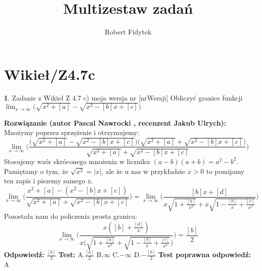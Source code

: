 \documentclass[12pt, a4paper]{article}
\title{Multizestaw zadań}
\author{Robert Fidytek}
\date{}
\theoremstyle{definition} %
\newtheorem{zad}{}
\newcommand{\kategoria}[1]{\section{#1}} %
\newcommand{\zadStart}[1]{\begin{zad}#1\newline} %
\newcommand{\zadStop}{\end{zad}}   %
\newcommand{\rozwStart}[2]{\noindent \textbf{Rozwiązanie (autor #1 , recenzent #2): }\newline} %
\newcommand{\rozwStop}{\newline}                                            %
\newcommand{\odpStart}{\noindent \textbf{Odpowiedź:}\newline}    %
\newcommand{\odpStop}{\newline}                                             %
\newcommand{\testStart}{\noindent \textbf{Test:}\newline} %
\newcommand{\testStop}{\newline} %
\newcommand{\kluczStart}{\noindent \textbf{Test poprawna odpowiedź:}\newline} %
\newcommand{\kluczStop}{\newline} %
\begin{document}
\maketitle


\kategoria{Wikieł/Z4.7c}
\zadStart{Zadanie z Wikieł Z 4.7 c) moja wersja nr [nrWersji]}
Obliczyć granice funkcji $\displaystyle{\lim_{x \to \infty}}\bigg(\sqrt{x^2+[a]}-\sqrt{x^2-[b]x+[c]}\bigg)$
\zadStop
\rozwStart{Pascal Nawrocki}{Jakub Ulrych}
Mnożymy poprzez sprzężenie i otrzymujemy:
$$\displaystyle{\lim_{x \to \infty}}\bigg(\frac{\bigg(\sqrt{x^2+[a]}-\sqrt{x^2-[b]x+[c]}\bigg)\bigg(\sqrt{x^2+[a]}+\sqrt{x^2-[b]x+[c]}\bigg)}{\sqrt{x^2+[a]}+\sqrt{x^2-[b]x+[c]}}\bigg)$$
Stosujemy wzór skróconego mnożenia w liczniku $(a-b)(a+b)=a^2-b^2$. Pamiętamy o tym, że $\sqrt{x^2}=|x|$, ale że u nas w przykładzie $x>0$ to pomijamy ten zapis i piszemy samego x.
$$\displaystyle{\lim_{x \to \infty}}\bigg(\frac{x^2+[a]-(x^2-[b]x+[c])}{\sqrt{x^2+[a]}+\sqrt{x^2-[b]x+[c]}}\bigg)=\displaystyle{\lim_{x \to \infty}}\bigg(\frac{[b]x+[d]}{x\sqrt{1+\frac{[a]}{x^2}}+x\sqrt{1-\frac{[b]}{x}+\frac{[c]}{x^2}}}\bigg)$$
Pozostała nam do policzenia prosta granica:
$$\displaystyle{\lim_{x \to \infty}}\bigg(\frac{x([b]+\frac{[d]}{x})}{x\bigg(\sqrt{1+\frac{[a]}{x^2}}+\sqrt{1-\frac{[b]}{x}+\frac{[c]}{x^2}}\bigg)}\bigg)=\frac{[b]}{2}$$
\rozwStop
\odpStart
$\frac{[b]}{2}$
\odpStop
\testStart
A.$\frac{[b]}{2}$
B.$\infty$
C.$-\infty$
D.$-\frac{[b]}{2}$
\testStop
\kluczStart
A
\kluczStop
\end{document}
